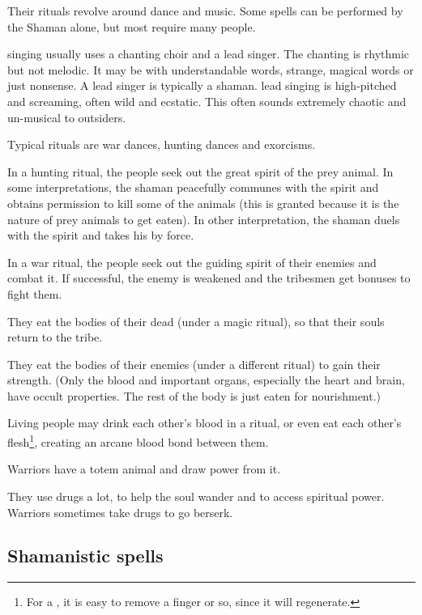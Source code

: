 Their rituals revolve around dance and music. Some spells can be performed by the Shaman alone, but most require many people. 

\Meccaran{} singing usually uses a chanting choir and a lead singer. The chanting is rhythmic but not melodic. It may be with understandable words, strange, magical words or just nonsense. A lead singer is typically a shaman. \Meccaran{} lead singing is high-pitched and screaming, often wild and ecstatic. This often sounds extremely chaotic and un-musical to outsiders. 

Typical rituals are war dances, hunting dances and exorcisms. 

In a hunting ritual, the people seek out the great spirit of the prey animal. In some interpretations, the shaman peacefully communes with the spirit and obtains permission to kill some of the animals (this is granted because it is the nature of prey animals to get eaten). In other interpretation, the shaman duels with the spirit and takes his  by force. 

In a war ritual, the people seek out the guiding spirit of their enemies and combat it. If successful, the enemy is weakened and the tribesmen get bonuses to fight them. 

They eat the bodies of their dead (under a magic ritual), so that their souls return to the tribe. 

They eat the bodies of their enemies (under a different ritual) to gain their strength. (Only the blood and important organs, especially the heart and brain, have occult properties. The rest of the body is just eaten for nourishment.) 

Living people may drink each other's blood in a ritual, or even eat each other's flesh\footnote{For a \meccaran, it is easy to remove a finger or so, since it will regenerate.}, creating an arcane blood bond between them. 

Warriors have a totem animal and draw power from it. 

They use drugs a lot, to help the soul wander and to access spiritual power. Warriors sometimes take drugs to go berserk. 









\subsection{Shamanistic spells}

